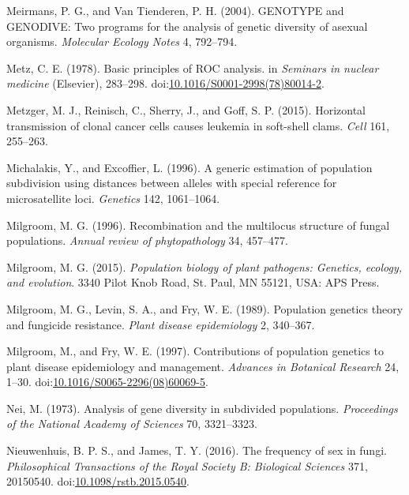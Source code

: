 \documentclass[double,12pt]{beavtex}
\begin{document}
  \hypertarget{ref-meirmans2004genotype}{}
  Meirmans, P. G., and Van Tienderen, P. H. (2004). GENOTYPE and GENODIVE:
  Two programs for the analysis of genetic diversity of asexual organisms.
  \emph{Molecular Ecology Notes} 4, 792--794.
  
  \hypertarget{ref-metz1978basic}{}
  Metz, C. E. (1978). Basic principles of ROC analysis. in \emph{Seminars
  in nuclear medicine} (Elsevier), 283--298.
  doi:\href{https://doi.org/10.1016/S0001-2998(78)80014-2}{10.1016/S0001-2998(78)80014-2}.
  
  \hypertarget{ref-metzger2015horizontal}{}
  Metzger, M. J., Reinisch, C., Sherry, J., and Goff, S. P. (2015).
  Horizontal transmission of clonal cancer cells causes leukemia in
  soft-shell clams. \emph{Cell} 161, 255--263.
  
  \hypertarget{ref-michalakis1996generic}{}
  Michalakis, Y., and Excoffier, L. (1996). A generic estimation of
  population subdivision using distances between alleles with special
  reference for microsatellite loci. \emph{Genetics} 142, 1061--1064.
  
  \hypertarget{ref-milgroom1996recombination}{}
  Milgroom, M. G. (1996). Recombination and the multilocus structure of
  fungal populations. \emph{Annual review of phytopathology} 34, 457--477.
  
  \hypertarget{ref-milgroom2015population}{}
  Milgroom, M. G. (2015). \emph{Population biology of plant pathogens:
  Genetics, ecology, and evolution}. 3340 Pilot Knob Road, St. Paul, MN
  55121, USA: APS Press.
  
  \hypertarget{ref-milgroom1989population}{}
  Milgroom, M. G., Levin, S. A., and Fry, W. E. (1989). Population
  genetics theory and fungicide resistance. \emph{Plant disease
  epidemiology} 2, 340--367.
  
  \hypertarget{ref-milgroom1997contributions}{}
  Milgroom, M., and Fry, W. E. (1997). Contributions of population
  genetics to plant disease epidemiology and management. \emph{Advances in
  Botanical Research} 24, 1--30.
  doi:\href{https://doi.org/10.1016/S0065-2296(08)60069-5}{10.1016/S0065-2296(08)60069-5}.
  
  \hypertarget{ref-nei1973analysis}{}
  Nei, M. (1973). Analysis of gene diversity in subdivided populations.
  \emph{Proceedings of the National Academy of Sciences} 70, 3321--3323.
  
  \hypertarget{ref-nieuwenhuis2016frequency}{}
  Nieuwenhuis, B. P. S., and James, T. Y. (2016). The frequency of sex in
  fungi. \emph{Philosophical Transactions of the Royal Society B:
  Biological Sciences} 371, 20150540.
  doi:\href{https://doi.org/10.1098/rstb.2015.0540}{10.1098/rstb.2015.0540}.
  
\end{document}
